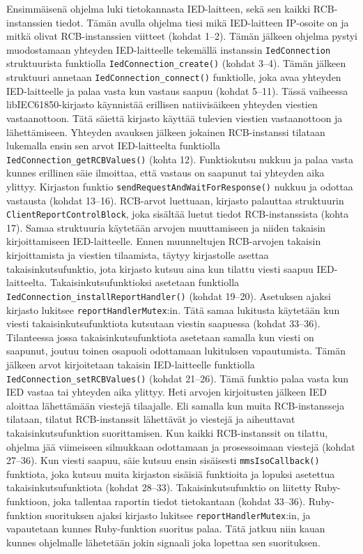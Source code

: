 Ensimmäisenä ohjelma luki tietokannasta IED-laitteen, sekä sen kaikki RCB-instanssien tiedot. Tämän avulla ohjelma tiesi mikä IED-laitteen IP-osoite on ja mitkä olivat RCB-instanssien viitteet (kohdat 1--2). Tämän jälkeen ohjelma pystyi muodostamaan yhteyden IED-laitteelle tekemällä instanssin \texttt{IedCon\-nec\-ti\-on} struktuurista funktiolla \texttt{Ied\-Con\-nec\-ti\-on\_crea\-te\-()} (kohdat 3--4). Tämän jälkeen struktuuri annetaan \texttt{Ied\-Con\-nec\-ti\-on\-\_\-con\-nect\-()} funktiolle, joka avaa yhteyden IED-laitteelle ja palaa vasta kun vastaus saapuu (kohdat 5--11). Tässä vaiheessa libIEC61850-kirjasto käynnistää erillisen natiivisäikeen yhteyden viestien vastaanottoon. Tätä säiettä kirjasto käyttää tulevien viestien vastaanottoon ja lähettämiseen. Yhteyden avauksen jälkeen jokainen RCB-instanssi tilataan lukemalla ensin sen arvot IED-laitteelta funktiolla \texttt{Ied\-Con\-nec\-ti\-on\-\_\-get\-RCB\-Va\-lu\-es\-()} (kohta 12). Funktiokutsu nukkuu ja palaa vasta kunnes erillinen säie ilmoittaa, että vastaus on saapunut tai yhteyden aika ylittyy. Kirjaston funktio  \texttt{send\-Re\-qu\-est\-And\-Wait\-For\-Res\-pon\-se\-()} nukkuu ja odottaa vastausta (kohdat 13--16). RCB-arvot luettuaan, kirjasto palauttaa struktuurin \texttt{Cli\-ent\-Re\-port\-Cont\-rol\-Block}, joka sisältää luetut tiedot RCB-instanssista (kohta 17). Samaa struktuuria käytetään arvojen muuttamiseen ja niiden takaisin kirjoittamiseen IED-laitteelle. Ennen muunneltujen RCB-arvojen takaisin kirjoittamista ja viestien tilaamista, täytyy kirjastolle asettaa takaisinkutsufunktio, jota kirjasto kutsuu aina kun tilattu viesti saapuu IED-laitteelta. Takaisinkutsufunktioksi asetetaan funktiolla \texttt{Ied\-Con\-nec\-ti\-on\-\_\-ins\-tall\-Re\-port\-Hand\-ler\-()} (kohdat 19--20). Asetuksen ajaksi kirjasto lukitsee \texttt{re\-port\-Hand\-ler\-Mu\-tex}:in. Tätä samaa lukitusta käytetään kun viesti takaisinkutsufunktiota kutsutaan viestin saapuessa (kohdat 33--36). Tilanteessa jossa takaisinkutsufunktiota asetetaan samalla kun viesti on saapunut, joutuu toinen osapuoli odottamaan lukituksen vapautumista. Tämän jälkeen arvot kirjoitetaan takaisin IED-laitteelle funktiolla \texttt{Ied\-Con\-nec\-ti\-on\-\_\-set\-RCB\-Va\-lu\-es\-()} (kohdat 21--26). Tämä funktio palaa vasta kun IED vastaa tai yhteyden aika ylittyy. Heti arvojen kirjoitusten jälkeen IED aloittaa lähettämään viestejä tilaajalle. Eli samalla kun muita RCB-instansseja tilataan, tilatut RCB-instanssit lähettävät jo viestejä ja aiheuttavat takaisinkutsufunktion suorittamisen. Kun kaikki RCB-instanssit on tilattu, ohjelma jää viimeiseen silmukkaan odottamaan ja prosessoimaan viestejä (kohdat 27--36). Kun viesti saapuu, säie kutsuu ensin sisäisesti \texttt{mms\-I\-so\-Call\-back\-()} funktiota, joka kutsuu muita kirjaston sisäisiä funktioita ja lopuksi asetettua takaisinkutsufunktiota (kohdat 28--33). Takaisinkutsufunktio on liitetty Ruby-funktioon, joka tallentaa raportin tiedot tietokantaan (kohdat 33--36). Ruby-funktion suorituksen ajaksi kirjasto lukitsee \texttt{re\-port\-Hand\-ler\-Mu\-tex}:in, ja vapautetaan kunnes Ruby-funktion suoritus palaa. Tätä jatkuu niin kauan kunnes ohjelmalle lähetetään jokin signaali joka lopettaa sen suorituksen. \mbox{\cite{libIEC61850-repo}}


